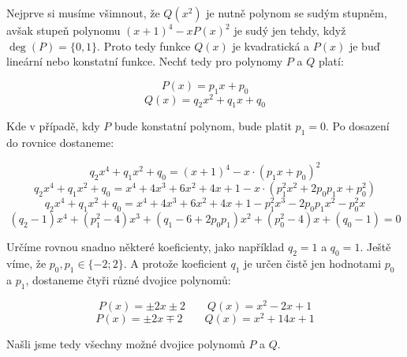 \documentclass{fkssolpub}
\author{Ondřej Sedláček}
\begin{document}
Nejprve si musíme všimnout, že $Q(x^2)$ je nutně polynom se sudým stupněm, avšak stupeň polynomu $(x + 1)^4 - x P(x)^2$ je sudý jen tehdy, když $\deg(P) = \{0,1\}$. Proto tedy funkce $Q(x)$ je kvadratická a $P(x)$ je buď lineární nebo konstatní funkce. Nechť tedy pro polynomy $P$ a $Q$ platí:

\[
	P(x) = p_1 x + p_0
\]
\[
	Q(x) = q_2 x^2 + q_1 x + q_0
\]

Kde v případě, kdy $P$ bude konstatní polynom, bude platit $p_1 = 0$. Po dosazení do rovnice dostaneme:

\[
	q_2 x^4 + q_1 x^2 + q_0 = (x + 1)^4 - x \cdot (p_1 x + p_0)^2
\]
\[
	q_2 x^4 + q_1 x^2 + q_0 = x^4 + 4x^3 + 6x^2 + 4x + 1 - x \cdot (p_1^2 x^2 + 2 p_0 p_1 x + p_0^2)
\]
\[
	q_2 x^4 + q_1 x^2 + q_0 = x^4 + 4x^3 + 6x^2 + 4x + 1 - p_1^2 x^3 - 2 p_0 p_1 x^2 - p_0^2 x
\]
\[
	(q_2 - 1) x^4 + (p_1^2 - 4) x^3 + (q_1 - 6 + 2 p_0 p_1) x^2 + (p_0^2 - 4) x + (q_0 - 1) = 0
\]

Určíme rovnou snadno některé koeficienty, jako například $q_2 = 1$ a $q_0 = 1$. Ještě víme, že $p_0, p_1 \in \{-2; 2\}$. A protože koeficient $q_1$ je určen čistě jen hodnotami $p_0$ a $p_1$, dostaneme čtyři různé dvojice polynomů:

\[
	P(x) = \pm 2 x \pm 2 \qquad Q(x) = x^2 - 2 x + 1
\]
\[
	P(x) = \pm 2 x \mp 2 \qquad Q(x) = x^2 + 14 x + 1
\]

Našli jsme tedy všechny možné dvojice polynomů $P$ a $Q$.
\end{document}
